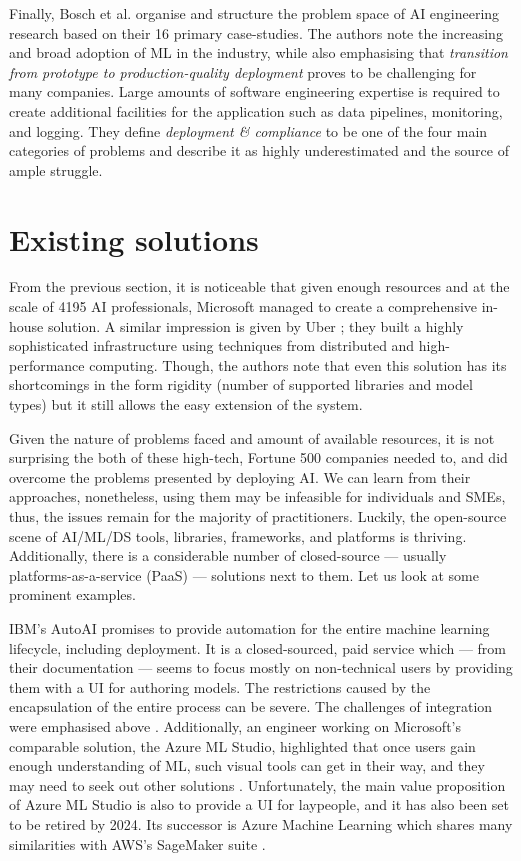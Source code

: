 Finally, Bosch et al. \cite{bosch2021engineering} organise and structure the problem space of AI engineering research based on their 16 primary case-studies. The authors note the increasing and broad adoption of ML in the industry, while also emphasising that \textit{transition from prototype to production-quality deployment} proves to be challenging for many companies. Large amounts of software engineering expertise is required to create additional facilities for the application such as data pipelines, monitoring, and logging. They define \textit{deployment \& compliance} to be one of the four main categories of problems and describe it as highly underestimated and the source of ample struggle.

\section{Existing solutions} \label{section:existing}

From the previous section, it is noticeable that given enough resources and at the scale of 4195 AI professionals, Microsoft managed to create a comprehensive in-house solution. A similar impression is given by Uber \cite{li2017scaling}; they built a highly sophisticated infrastructure using techniques from distributed and high-performance computing. Though, the authors note that even this solution has its shortcomings in the form rigidity (number of supported libraries and model types) but it still allows the easy extension of the system.

Given the nature of problems faced and amount of available resources, it is not surprising the both of these high-tech, Fortune 500 companies needed to, and did overcome the problems presented by deploying AI. We can learn from their approaches, nonetheless, using them may be infeasible for individuals and SMEs, thus, the issues remain for the majority of practitioners. Luckily, the open-source scene of AI/ML/DS tools, libraries, frameworks, and platforms is thriving. Additionally, there is a considerable number of closed-source --- usually platforms-as-a-service (PaaS) --- solutions next to them. Let us look at some prominent examples.

IBM's AutoAI \cite{wang2020autoai} promises to provide automation for the entire machine learning lifecycle, including deployment. It is a closed-sourced, paid service which --- from their documentation --- seems to focus mostly on non-technical users by providing them with a UI for authoring models. The restrictions caused by the encapsulation of the entire process can be severe. The challenges of integration were emphasised above \cite{sculley2015hidden}. Additionally, an engineer working on Microsoft's comparable solution, the Azure ML Studio, highlighted that once users gain enough understanding of ML, such visual tools can get in their way, and they may need to seek out other solutions \cite{amershi2019software}. Unfortunately, the main value proposition of Azure ML Studio is also to provide a UI for laypeople, and it has also been set to be retired by 2024. Its successor is Azure Machine Learning which shares many similarities with AWS's SageMaker suite \cite{joshi2020amazon}.

